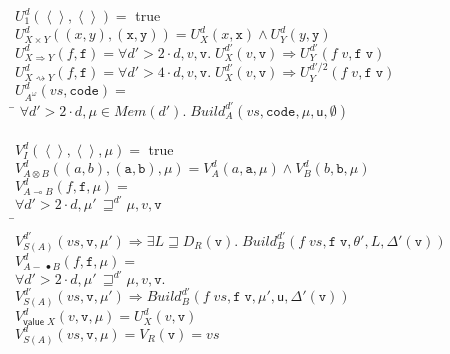 \documentclass[preprint]{sigplanconf}
\newcommand{\betterstate}[3]{{#2}\, {\sqsupseteq}^{#1} {#3}}
\renewcommand{\implies}{\Rightarrow}
\newcommand{\term}[1]{\ensuremath{\mathtt{{#1}}}}
\newcommand{\To}{\Rightarrow}
\newcommand{\shrink}{\rightsquigarrow}
\newcommand{\unitval}{\left<\right>}
\newcommand{\Build}{\mathit{Build}}
\newcommand{\Mem}[1]{\mathit{Mem}(#1)}
\newcommand{\lolli}{\multimap}
\newcommand{\lollishrink}{-\!\!\!\,\bullet}
\newcommand{\valtype}[1]{\mathsf{value}\;{#1}}
\newcommand{\U}{\mathsf{u}}
\begin{document}
\begin{figure}
\label{logical-relation}  
\begin{tabbing}
$U^d_1(\unitval, \unitval) = $ true 
\\[1em]

$U^d_{X \times Y}((x,y), (\term{x}, \term{y})) = U^d_X(x, \term{x}) \land U^d_Y(y, \term{y})$ 
\\[1em]

$U^d_{X \To Y}(f, \term{f}) = \forall d' > 2\cdot d, v, \term{v}.\; 
    U^{d'}_X(v, \term{v}) \implies U^{d'}_Y(f\;v, \term{f\;v})$ 
\\[1em]

$U^d_{X \shrink Y}(f, \term{f}) = \forall d' > 4\cdot d, v, \term{v}.\; 
    U^{d'}_X(v, \term{v}) \implies U^{d'/2}_Y(f\;v, \term{f\;v})$ 
\\[1em]

$U^d_{A^\omega}(vs, \term{code}) = $ \\
\;\;\= $\forall d' > 2\cdot d, \mu \in \Mem{d'}.\;\Build^{d'}_A(vs, \term{code}, \mu, \U, \emptyset)$ \\
\\[1em]

$V^d_I(\unitval, \unitval, \mu) = $ true
\\[1em]

$V^d_{A \otimes B}((a,b), \term{(a,b)}, \mu) = V^d_A(a, \term{a}, \mu) \land V^d_B(b, \term{b}, \mu)$
\\[1em]

$V^d_{A \lolli B}(f, \term{f}, \mu) = $ \\
\> $\forall d' > 2\cdot d, \betterstate{d'}{\mu'}{\mu}, v, \term{v}$ \\
\> \;\;\=$V^{d'}_{S(A)}(vs, \term{v}, \mu') \implies 
          \exists L \sqsupseteq D_R(\term{v}).\; \Build^{d'}_{B}(f\;vs, \term{f\;v}, \theta', L, \Delta'(\term{v}))$
\\[1em]

$V^d_{A \lollishrink B}(f, \term{f}, \mu) = $ \\
\> $\forall d' > 2\cdot d, \betterstate{d'}{\mu'}{\mu}, v, \term{v}.$ \\
\> \> $V^{d'}_{S(A)}(vs, \term{v}, \mu') \implies 
      \Build^{d'}_{B}(f\;vs, \term{f\;v}, \mu', \U, \Delta'(\term{v}))$
\\[1em]

$V^d_{\valtype{X}}(v, \term{v}, \mu) = U^d_{X}(v, \term{v})$ 
\\[1em]

$V^d_{S(A)}(vs, \term{v}, \mu) = V_R(\term{v}) = vs$ 
\\[1em]


\end{tabbing}
\end{figure}
\end{document}
